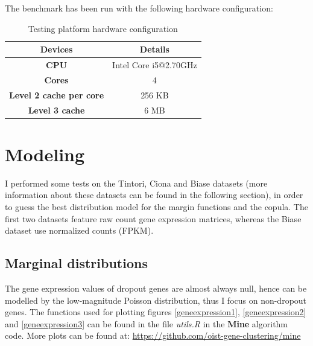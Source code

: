 \documentclass{report}
\begin{document}
{The benchmark has been run with the following hardware configuration:

\begin{table}[H]
\centering
\caption{Testing platform hardware configuration}
\begin{tabular}{| c | c |}
\hline
\parbox[c]{5cm}{\textbf{Devices}} & 
\parbox[c]{5cm}{\textbf{Details}}\\
\hline
\parbox[c]{5cm}{\textbf{CPU}} & 
\parbox[c]{5cm}{Intel Core i5@2.70GHz}\\
\hline
\parbox[c]{5cm}{\textbf{Cores}} & 
\parbox[c]{5cm}{4}\\
\hline
\parbox[c]{5cm}{\textbf{Level 2 cache per core}} & 
\parbox[c]{5cm}{256 KB}\\
\hline
\parbox[c]{5cm}{\textbf{Level 3 cache}} & 
\parbox[c]{5cm}{6 MB}\\
\hline
\end{tabular}
\end{table}

\chapter{Modeling}

I performed some tests on the Tintori, Ciona and Biase datasets (more information about these datasets can be found in the following section), in order to guess the best distribution model for the margin functions and the copula. The first two datasets feature raw count gene expression matrices, whereas the Biase dataset use normalized counts (FPKM).

\section*{Marginal distributions}

The gene expression values of dropout genes are almost always null, hence can be modelled by the low-magnitude Poisson distribution, thus I focus on non-dropout genes. The functions used for plotting figures \ref{geneexpression1}, \ref{geneexpression2} and \ref{geneexpression3} can be found in the file \textit{utils.R} in the \textbf{Mine} algorithm code. More plots can be found at: {\url{https://github.com/oist-gene-clustering/mine}}\\

}
\end{document}
